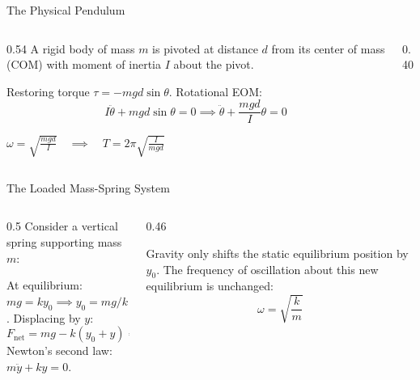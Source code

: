 \documentclass[aspectratio=169,xcolor=dvipsnames]{beamer}
\begin{document}
\begin{frame}{The Physical Pendulum}
  \begin{columns}[T]
    \begin{column}{0.54\textwidth}
      A rigid body of mass $m$ is pivoted at distance $d$ from its center of mass (COM) with moment of inertia $I$ about the pivot.
      \begin{umnote}[Derivation]
        Restoring torque $\tau = -mgd\sin\theta$. Rotational EOM:
        \[
          I \ddot{\theta} + mgd\sin\theta = 0 \implies \ddot{\theta} + \frac{mgd}{I}\theta = 0
        \]
      \end{umnote}
      \begin{umformula}
        \centering
        $\omega = \sqrt{\frac{mgd}{I}} \quad \implies \quad T = 2\pi\sqrt{\frac{I}{mgd}}$
      \end{umformula}
    \end{column}
    \hfill
    \begin{column}{0.40\textwidth}
      \centering
    \end{column}
  \end{columns}
\end{frame}

\begin{frame}{The Loaded Mass-Spring System}
  \begin{columns}[T]
    \begin{column}{0.5\textwidth}
      Consider a vertical spring supporting mass $m$:
      \begin{umnote}[Derivation]
        At equilibrium: $mg = ky_0 \implies y_0 = mg/k$.
        Displacing by $y$:
        \[
          F_{\text{net}} = mg - k(y_0 + y) = -ky
        \]
        Newton's second law: $m\ddot{y} + ky = 0$.
      \end{umnote}
    \end{column}
    \hfill
    \begin{column}{0.46\textwidth}
      \begin{umnote}
        Gravity only shifts the static equilibrium position by $y_0$.
        The frequency of oscillation about this new equilibrium is unchanged:
        \[
          \omega = \sqrt{\frac{k}{m}}
        \]
      \end{umnote}
    \end{column}
  \end{columns}
\end{frame}
\end{document}
